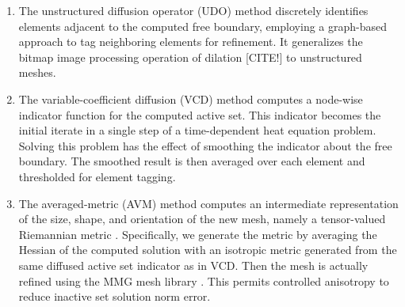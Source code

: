 \documentclass[]{interact}
\theoremstyle{plain}%
\theoremstyle{definition}
\theoremstyle{remark}
\begin{document}
\renewcommand{\labelenumi}{(\roman{enumi})}
\begin{enumerate}
\item The unstructured diffusion operator (UDO) method discretely identifies elements adjacent to the computed free boundary, employing a graph-based approach to tag neighboring elements for refinement.  It generalizes the bitmap image processing operation of dilation [CITE!] to unstructured meshes.
\item The variable-coefficient diffusion (VCD) method computes a node-wise indicator function for the computed active set.  This indicator becomes the initial iterate in a single step of a time-dependent heat equation problem.  Solving this problem has the effect of smoothing the indicator about the free boundary.  The smoothed result is then averaged over each element and thresholded for element tagging.
\item The averaged-metric (AVM) method computes an intermediate representation of the size, shape, and orientation of the new mesh, namely a tensor-valued Riemannian metric \cite{Alauzet2010}.  Specifically, we generate the metric by averaging the Hessian of the computed solution with an isotropic metric generated from the same diffused active set indicator as in VCD.  Then the mesh is actually refined using the MMG mesh library \cite{DapognyDobrzynskiFrey2014}.  This permits controlled anisotropy \cite{Wallworketal2020} to reduce inactive set solution norm error.
\end{enumerate}

\end{document}
